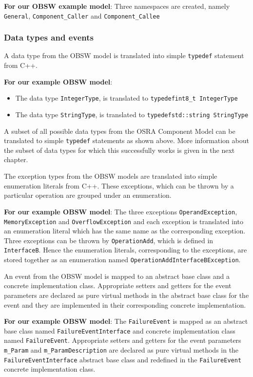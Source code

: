 \textbf{For our OBSW example model}: Three namespaces are created, namely \texttt{General}, \texttt{Component\_Caller} and \texttt{Component\_Callee} 

\subsubsection{\textbf{Data types and events}}
A data type from the OBSW model is translated into simple \texttt{typedef} statement from C++.

\textbf{For our example OBSW model}:
\begin{itemize}
\item The data type \texttt{IntegerType}, is translated to \texttt{typedef\allowbreak  int8\_t IntegerType}
\item The data type \texttt{StringType}, is translated to \texttt{typedef\allowbreak std::string StringType} 
\end{itemize}

A subset of all possible data types from the OSRA Component Model can be translated to simple \texttt{typedef} statements as shown above. More information about the subset of data types for which this successfully works is given in the next chapter. 

The exception types from the OBSW models are translated into simple enumeration literals from C++. These exceptions, which can be thrown by a particular operation are grouped under an enumeration.

\textbf{For our example OBSW model}: The three exceptions \texttt{Operand\allowbreak Exception}, \texttt{Memory\allowbreak Exception} and \texttt{Overflow\allowbreak Exception} and each exception is translated into an enumeration literal which has the same name as the corresponding exception. Three exceptions can be thrown by \texttt{OperationAdd}, which is defined in \texttt{InterfaceB}. Hence the enumeration literals, corresponding to the exceptions, are stored together as an enumeration named \texttt{OperationAdd\allowbreak InterfaceB\allowbreak Exception}.

An event from the OBSW model is mapped to an abstract base class and a concrete implementation class. Appropriate setters and getters for the event parameters are declared as pure virtual methods in the abstract base class for the event and they are implemented in their corresponding concrete implementation.

\textbf{For our example OBSW model}: The \texttt{FailureEvent} is mapped as an abstract base class named \texttt{FailureEvent\allowbreak Interface} and concrete implementation class named \texttt{FailureEvent}. Appropriate setters and getters for the event parameters \texttt{m\_Param} and \texttt{m\_ParamDescription} are declared as pure virtual methods in the \texttt{FailureEvent\allowbreak Interface} abstract base class and redefined in the \texttt{FailureEvent} concrete implementation class.   

